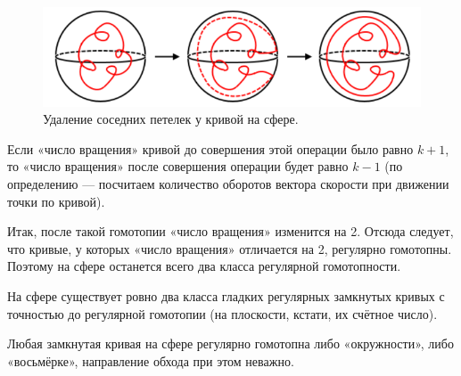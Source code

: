 \begin{figure}[htbp]
    \centering
    \includegraphics[scale=0.7]{images/c13.6.png}
    \caption{Удаление соседних петелек у кривой на сфере.}
    \label{fig:c13.6}
\end{figure}

Если «число вращения» кривой до совершения этой операции было равно $k+1$, то «число вращения» после совершения операции будет равно $k-1$ (по определению — посчитаем количество оборотов вектора скорости при движении точки по кривой).

Итак, после такой гомотопии «число вращения» изменится на 2. Отсюда следует, что кривые, у которых «число вращения» отличается на 2, регулярно гомотопны. Поэтому на сфере останется всего два класса регулярной гомотопности.

\begin{statement}
    На сфере существует ровно два класса гладких регулярных замкнутых кривых с точностью до регулярной гомотопии (на плоскости, кстати, их счётное число).
\end{statement} 

\begin{theorem}
    Любая замкнутая кривая на сфере регулярно гомотопна либо «окружности», либо «восьмёрке», направление обхода при этом неважно.
\end{theorem} 